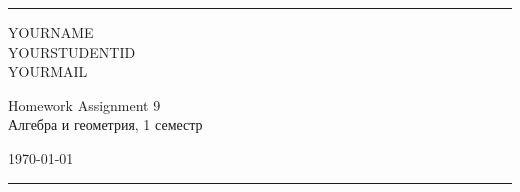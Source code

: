 \documentclass[a4paper, 12pt]{article}
\begin{document}

\fancyhead[C]{}
\hrule \medskip %
\begin{minipage}{0.295\textwidth} 
\raggedright\footnotesize
YOURNAME \hfill\\   
YOURSTUDENTID \hfill\\
YOURMAIL
\end{minipage}
\begin{minipage}{0.4\textwidth} 
\centering\large 
Homework Assignment 9\\ 
\normalsize 
Алгебра и геометрия, 1 семестр\\ 
\end{minipage}
\begin{minipage}{0.295\textwidth} 
\raggedleft
\today\hfill\\
\end{minipage}
\medskip\hrule 
\bigskip

\end{document}
